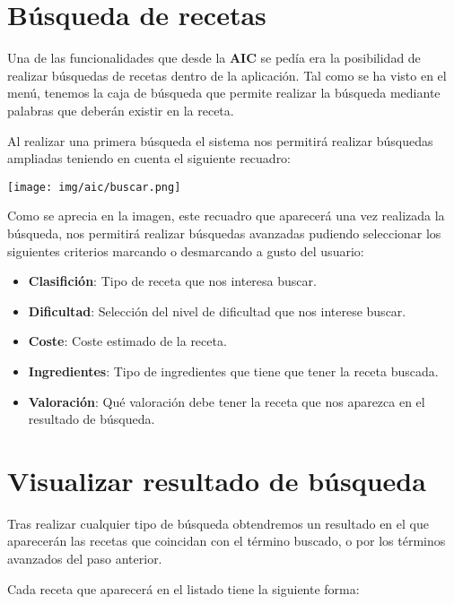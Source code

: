 \documentclass{\ClassPath/viu-tfm-template}
\begin{document}
\section{Búsqueda de recetas}

Una de las funcionalidades que desde la \textbf{AIC} se pedía era la posibilidad de realizar búsquedas de recetas dentro de la aplicación. Tal como se ha visto en el menú, tenemos la caja de búsqueda que permite realizar la búsqueda mediante palabras que deberán existir en la receta.

Al realizar una primera búsqueda el sistema nos permitirá realizar búsquedas ampliadas teniendo en cuenta el siguiente recuadro:

    \begin{center}
        \vspace{-10pt}
        \texttt{[image: img/aic/buscar.png]}
        \vspace{-20pt}
    \end{center}

Como se aprecia en la imagen, este recuadro que aparecerá una vez realizada la búsqueda, nos permitirá realizar búsquedas avanzadas pudiendo seleccionar los siguientes criterios marcando o desmarcando a gusto del usuario:

\begin{itemize}
    \item \textbf{Clasifición}: Tipo de receta que nos interesa buscar.
    \item \textbf{Dificultad}: Selección del nivel de dificultad que nos interese buscar.
    \item \textbf{Coste}: Coste estimado de la receta.
    \item \textbf{Ingredientes}: Tipo de ingredientes que tiene que tener la receta buscada.
    \item \textbf{Valoración}: Qué valoración debe tener la receta que nos aparezca en el resultado de búsqueda.
\end{itemize}


\section{Visualizar resultado de búsqueda}

Tras realizar cualquier tipo de búsqueda obtendremos un resultado en el que aparecerán las recetas que coincidan con el término buscado, o por los términos avanzados del paso anterior.

Cada receta que aparecerá en el listado tiene la siguiente forma:
\end{document}
